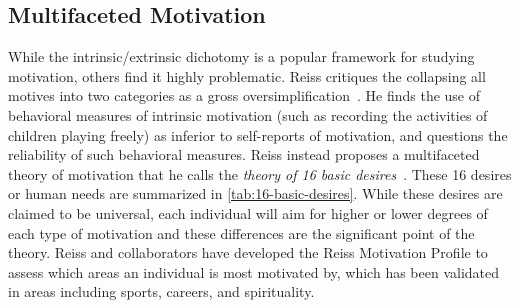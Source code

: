 \subsection{Multifaceted Motivation}

While the intrinsic/extrinsic dichotomy is a popular framework for studying motivation, others find it highly problematic. Reiss critiques the collapsing all motives into two categories as a gross oversimplification~\cite{Reiss2012}. He finds the use of behavioral measures of intrinsic motivation (such as recording the activities of children playing freely) as inferior to self-reports of motivation, and questions the reliability of such behavioral measures. Reiss instead proposes a multifaceted theory of motivation that he calls the \emph{theory of 16 basic desires}~\cite{Reiss2004}. These 16 desires or human needs are summarized in \autoref{tab:16-basic-desires}. While these desires are claimed to be universal, each individual will aim for higher or lower degrees of each type of motivation and these differences are the significant point of the theory. Reiss and collaborators have developed the Reiss Motivation Profile to assess which areas an individual is most motivated by, which has been validated in areas including sports, careers, and spirituality.


